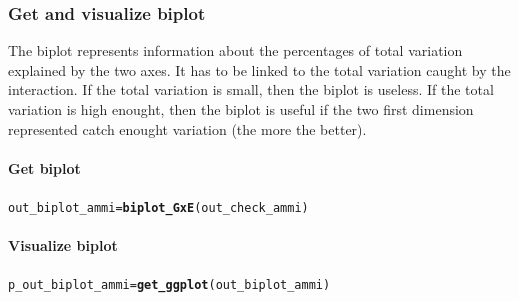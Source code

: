 \documentclass{book}\usepackage[]{graphicx}\usepackage[]{color}
\makeatletter
\newcommand{\hlstd}[1]{\textcolor[rgb]{0.345,0.345,0.345}{#1}}%
\newcommand{\hlkwb}[1]{\textcolor[rgb]{0.69,0.353,0.396}{#1}}%
\newcommand{\hlkwd}[1]{\textcolor[rgb]{0.737,0.353,0.396}{\textbf{#1}}}%
\newenvironment{kframe}{%
 \def\at@end@of@kframe{}%
 \ifinner\ifhmode%
  \def\at@end@of@kframe{\end{minipage}}%
  \begin{minipage}{\columnwidth}%
 \fi\fi%
 \def\FrameCommand##1{\hskip\@totalleftmargin \hskip-\fboxsep
 \colorbox{shadecolor}{##1}\hskip-\fboxsep
     \hskip-\linewidth \hskip-\@totalleftmargin \hskip\columnwidth}%
 \MakeFramed {\advance\hsize-\width
   \@totalleftmargin\z@ \linewidth\hsize
   \@setminipage}}%
 {\par\unskip\endMakeFramed%
 \at@end@of@kframe}
\newenvironment{knitrout}{}{} %
\makeatother
\begin{document}
\subsubsection{Get and visualize biplot}

The biplot represents information about the percentages of total variation explained by the two axes.
It has to be linked to the total variation caught by the interaction.
If the total variation is small, then the biplot is useless.
If the total variation is high enought, then the biplot is useful if the two first dimension represented catch enought variation (the more the better).

\paragraph{Get biplot}

\begin{knitrout}
\color{fgcolor}\begin{kframe}
\begin{alltt}
\hlstd{out_biplot_ammi} \hlkwb{=} \hlkwd{biplot_GxE}\hlstd{(out_check_ammi)}
\end{alltt}
\end{kframe}
\end{knitrout}

\paragraph{Visualize biplot}

\begin{knitrout}
\color{fgcolor}\begin{kframe}
\begin{alltt}
\hlstd{p_out_biplot_ammi} \hlkwb{=} \hlkwd{get_ggplot}\hlstd{(out_biplot_ammi)}
\end{alltt}
\end{kframe}
\end{knitrout}
\end{document}
